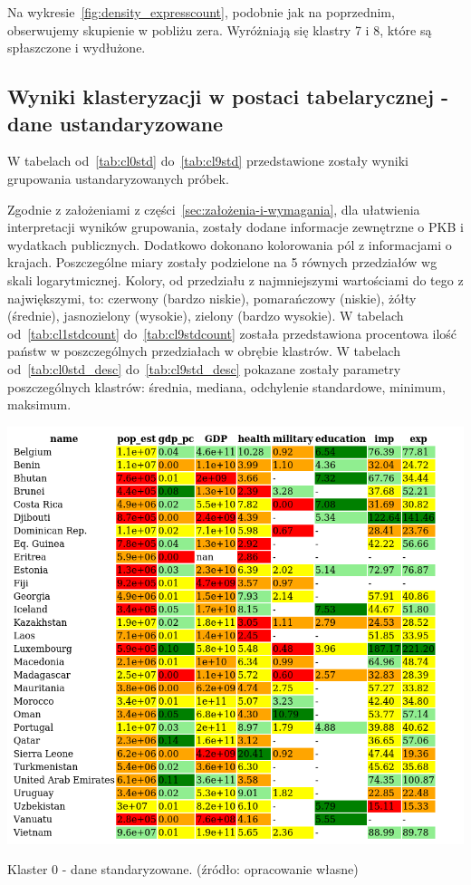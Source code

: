 \documentclass[11pt]{report}
\begin{document}
    Na wykresie~\ref{fig:density_expresscount}, podobnie jak na poprzednim, obserwujemy skupienie w pobliżu zera.
    Wyróżniają się klastry 7 i 8, które są spłaszczone i wydłużone.

    \subsection{Wyniki klasteryzacji w postaci tabelarycznej - dane ustandaryzowane}
    W tabelach od~\ref{tab:cl0std} do~\ref{tab:cl9std} przedstawione zostały wyniki grupowania ustandaryzowanych próbek.

    Zgodnie z założeniami z części~\ref{sec:założenia-i-wymagania}, dla ułatwienia interpretacji wyników grupowania, zostały dodane informacje zewnętrzne o PKB i wydatkach publicznych.
    Dodatkowo dokonano kolorowania pól z informacjami o krajach.
    Poszczególne miary zostały podzielone na 5 równych przedziałów wg skali logarytmicznej.
    Kolory, od przedziału z najmniejszymi wartościami do tego z największymi, to: czerwony (bardzo niskie), pomarańczowy (niskie), żółty (średnie), jasnozielony (wysokie), zielony (bardzo wysokie).
    W tabelach od~\ref{tab:cl1stdcount} do~\ref{tab:cl9stdcount} została przedstawiona procentowa ilość państw w poszczególnych przedziałach w obrębie klastrów.
    W tabelach od~\ref{tab:cl0std_desc} do~\ref{tab:cl9std_desc} pokazane zostały parametry poszczególnych klastrów: średnia, mediana, odchylenie standardowe, minimum, maksimum.


    \begin{table}[!htp]
        \centering
        \includegraphics[width=\linewidth]{tables/CLUST/cluster0stdkmeans.png}
        \caption{Klaster 0 - dane standaryzowane. (źródło: opracowanie własne)}
        \label{tab:cl0std}
    \end{table}
\end{document}
